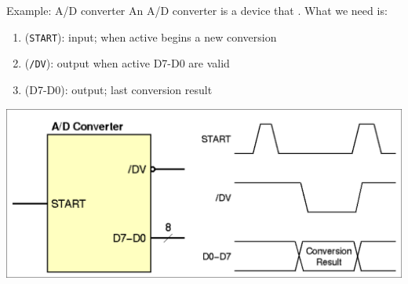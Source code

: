 \begin{parag}{Example: A/D converter}
    An A/D converter is a device that . What we need is:
	\begin{enumerate}
	    \item {} (\texttt{START}): input; when active \textrightarrow begins a new conversion
	    \item {} (\texttt{/DV}): output when active \textrightarrow D7-D0 are valid
	    \item {} (D7-D0): output; last conversion result
	\end{enumerate}
	\begin{center}
	\includegraphics[scale=0.2]{screenshots/2025-10-22_7.png}
	\end{center}
	
\end{parag}


